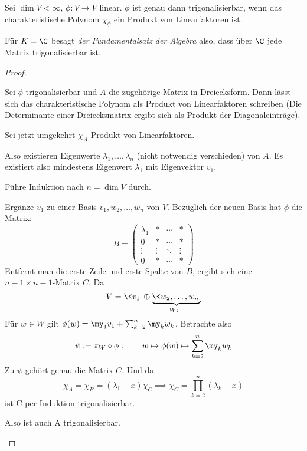 \documentclass{mycourse}
\begin{document}
\begin{thm}
Sei $\dim V <\infty$, $\phi: V\to V$ linear.
$\phi$ ist genau dann trigonalisierbar, wenn das charakteristische Polynom $\chi_\phi$ ein Produkt von Linearfaktoren ist.
\begin{note}
Für $K=\C$ besagt \emph{der Fundamentalsatz der Algebra} also, dass über $\C$ jede Matrix trigonalisierbar ist.
\end{note}

\begin{proof}
	\begin{seg}[$\Longrightarrow$]
Sei $\phi$ trigonalisierbar und $A$ die zugehörige Matrix in Dreiecksform.
Dann lässt sich das charakteristische Polynom als Produkt von Linearfaktoren schreiben
(Die Determinante einer Dreiecksmatrix ergibt sich als Produkt der Diagonaleinträge).
\end{seg}
\begin{seg}[$\Longleftarrow$]
Sei jetzt umgekehrt $\chi_A$ Produkt von Linearfaktoren.

Also existieren Eigenwerte $\lambda_1, \dotsc, \lambda_n$ (nicht notwendig verschieden) von $A$.
Es existiert also mindestens Eigenwert $\lambda_1$ mit Eigenvektor $v_1$.

Führe Induktion nach $n=\dim V$ durch.

Ergänze $v_1$ zu einer Basis $v_1,w_2,\dotsc,w_n$ von $V$.
Bezüglich der neuen Basis hat $\phi$ die Matrix:
\[
B=\begin{pmatrix}\lambda_1 & * & \cdots & * \\
0 & * & \cdots & * \\
\vdots & \vdots & \ddots & \vdots \\
0 & * & \cdots & *
\end{pmatrix}
\]
Entfernt man die erste Zeile und erste Spalte von $B$, ergibt sich eine $n-1\times n-1$-Matrix $C$.
Da
\[
V=\<v_1\>\oplus \underbrace{\<w_2,\dotsc,w_n\>}_{W:=}
\]
Für $w\in W$ gilt $\phi(w)=\my_1v_1+\sum_{k=2}^n\my_kw_k$.
Betrachte also
\[
\psi := \pi_W \circ \phi:\qquad w\mapsto \phi(w)\mapsto \sum_{k=2}^n\my_kw_k
\]
Zu $\psi$ gehört genau die Matrix $C$.
Und da
\[
\chi_A= \chi_B = (\lambda_1-x)\chi_C \implies \chi_C = \prod_{k=2}^n(\lambda_k-x)
\]
ist C per Induktion trigonalisierbar.

Also ist auch A trigonalisierbar.
\end{seg}
\end{proof}
\end{thm}
\end{document}
